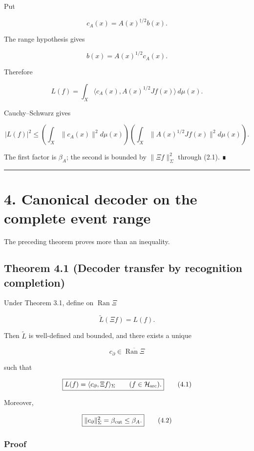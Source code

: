 Put

\[
c_A(x)=A(x)^{\dagger/2}b(x).
\]

The range hypothesis gives

\[
b(x)=A(x)^{1/2}c_A(x).
\]

Therefore

\[
L(f)
=
\int_X
\langle c_A(x),A(x)^{1/2}Jf(x)\rangle\,d\mu(x).
\]

Cauchy--Schwarz gives

\[
|L(f)|^2
\le
\left(
\int_X\|c_A(x)\|^2d\mu(x)
\right)
\left(
\int_X\|A(x)^{1/2}Jf(x)\|^2d\mu(x)
\right).
\]

The first factor is \(\beta_A\); the second is bounded by
\(\|\Xi f\|_\Sigma^2\) through (2.1). ∎

\begin{center}\rule{0.5\linewidth}{0.5pt}\end{center}

\hypertarget{canonical-decoder-on-the-complete-event-range}{%
\section{4. Canonical decoder on the complete event range}\label{canonical-decoder-on-the-complete-event-range}}

The preceding theorem proves more than an inequality.

\hypertarget{theorem-4.1-decoder-transfer-by-recognition-completion}{%
\subsection{Theorem 4.1 (Decoder transfer by recognition completion)}\label{theorem-4.1-decoder-transfer-by-recognition-completion}}

Under Theorem 3.1, define on \(\operatorname{Ran}\Xi\)

\[
\widetilde L(\Xi f)=L(f).
\]

Then \(\widetilde L\) is well-defined and bounded, and there exists a unique

\[
c_\partial\in\overline{\operatorname{Ran}\Xi}
\]

such that

\[
\boxed{
L(f)=\langle c_\partial,\Xi f\rangle_\Sigma
\qquad(f\in\mathcal H_{\rm src}).
}
\tag{4.1}
\]

Moreover,

\[
\boxed{
\|c_\partial\|_\Sigma^2
=\beta_{\rm cut}
\le\beta_A.
}
\tag{4.2}
\]

\hypertarget{proof-1}{%
\subsubsection{Proof}\label{proof-1}}

